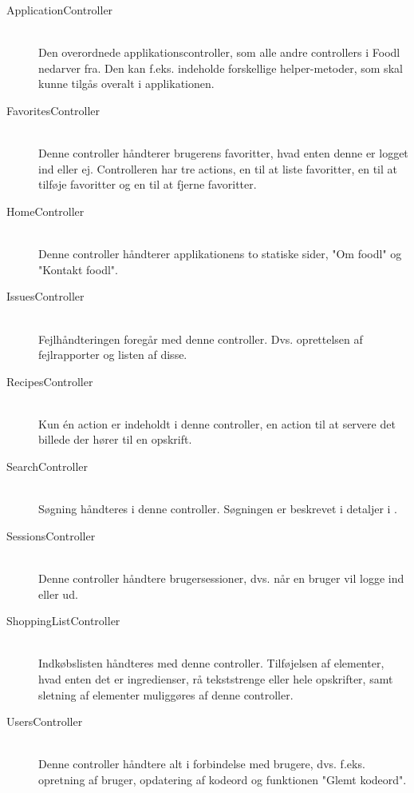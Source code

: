 \begin{description}
\item[ApplicationController] \hfill \\ 
Den overordnede applikationscontroller, som alle andre controllers i Foodl nedarver fra. Den kan f.eks. indeholde forskellige helper-metoder, som skal kunne tilgås overalt i applikationen.

\item[FavoritesController] \hfill \\ 
Denne controller håndterer brugerens favoritter, hvad enten denne er logget ind eller ej. Controlleren har tre actions, en til at liste favoritter, en til at tilføje favoritter og en til at fjerne favoritter.

\item[HomeController] \hfill \\ 
Denne controller håndterer applikationens to statiske sider, "Om foodl" og "Kontakt foodl".

\item[IssuesController] \hfill \\ 
Fejlhåndteringen foregår med denne controller. Dvs. oprettelsen af fejlrapporter og listen af disse.

\item[RecipesController] \hfill \\
Kun én action er indeholdt i denne controller, en action til at servere det billede der hører til en opskrift.

\item[SearchController] \hfill \\
Søgning håndteres i denne controller. Søgningen er beskrevet i detaljer i .

\item[SessionsController] \hfill \\
Denne controller håndtere brugersessioner, dvs. når en bruger vil logge ind eller ud.

\item[ShoppingListController] \hfill \\
Indkøbslisten håndteres med denne controller. Tilføjelsen af elementer, hvad enten det er ingredienser, rå tekststrenge eller hele opskrifter, samt sletning af elementer muliggøres af denne controller.

\item[UsersController] \hfill \\
Denne controller håndtere alt i forbindelse med brugere, dvs. f.eks. opretning af bruger, opdatering af kodeord og funktionen "Glemt kodeord".

\end{description}

